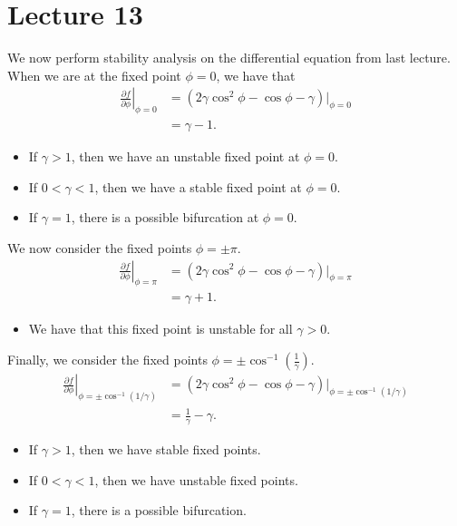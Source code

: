 \documentclass[class=article, crop=false]{standalone}
\begin{document}
  \section{Lecture 13}
  We now perform stability analysis on the differential equation from last lecture. When we are at the fixed point $\phi = 0$, we have that
  \begin{align*}
    \left.\frac{\partial f}{\partial \phi}\right|_{\phi = 0} &= (2\gamma\cos^2\phi - \cos\phi - \gamma)|_{\phi = 0} \\
                                                             &= \gamma - 1.
  \end{align*}
  \begin{itemize}
    \item If $\gamma > 1$, then we have an unstable fixed point at $\phi = 0$.
    \item If $0 < \gamma < 1$, then we have a stable fixed point at $\phi = 0$.
    \item If $\gamma = 1$, there is a possible bifurcation at $\phi = 0$.
  \end{itemize}
  We now consider the fixed points $\phi = \pm\pi$.
  \begin{align*}
    \left.\frac{\partial f}{\partial \phi}\right|_{\phi = \pi} &= (2\gamma\cos^2\phi - \cos\phi - \gamma)|_{\phi = \pi} \\
                                                             &= \gamma + 1.
  \end{align*}
  \begin{itemize}
    \item We have that this fixed point is unstable for all $\gamma > 0$.
  \end{itemize}
  Finally, we consider the fixed points $\phi = \pm\cos^{-1}(\frac{1}{\gamma})$.
  \begin{align*}
    \left.\frac{\partial f}{\partial \phi}\right|_{\phi = \pm\cos^{-1}{(1/\gamma)}} &= (2\gamma\cos^2\phi - \cos\phi - \gamma)|_{\phi = \pm\cos^{-1}{(1/\gamma)}} \\
                                                             &= \frac{1}{\gamma} - \gamma.
  \end{align*}
  \begin{itemize}
    \item If $\gamma > 1$, then we have stable fixed points.
    \item If $0 < \gamma < 1$, then we have unstable fixed points.
    \item If $\gamma = 1$, there is a possible bifurcation.
  \end{itemize}
\end{document}
